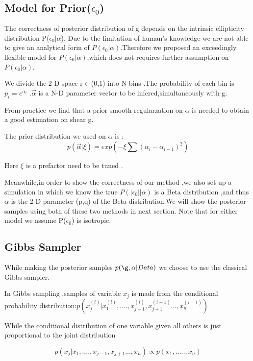 \documentclass[useAMS,usenatbib]{mn2e}
\begin{document}
\subsection{Model for Prior($\epsilon_{0}$)}

The correctness of posterior distribution of g depends on the intrinsic
ellipticity distribution P($\epsilon_{0}|\alpha$). Due to the limitation
of human's knowledge we are not able to give an analytical form of
$P(\epsilon_{0}|\alpha)$.Therefore we proposed an exceedingly flexible
model for $P(\epsilon_{0}|\alpha)$,which does not requires further
assumption on $P(\epsilon_{0}|\alpha)$.

We divide the 2-D space r$\in$(0,1) into N bins .The probability
of each bin is $p_{i}=e^{\alpha_{i}}$ .$\overrightarrow{\alpha}$
is a N-D parameter vector to be infered,simultaneously with g.

From practice we find that a prior smooth regularzation on $\alpha$
is needed to obtain a good estimation on shear g.

The prior distribution we used on $\alpha$ is : 
\begin{equation}
p(\vec{\alpha}|\xi)=exp(-\xi\sum(\alpha_{i}-\alpha_{i-1})^{2})
\end{equation}


Here $\xi$ is a prefactor need to be tuned .

Meanwhile,in order to show the correctness of our method ,we also
set up a simulation in which we know the true $P(|\epsilon_{0}||\alpha)$
is a Beta distribution ,and thus $\alpha$ is the 2-D parameter (p,q)
of the Beta distribution.We will show the posterior samples using
both of these two methods in next section. Note that for either model
we assume P($\epsilon_{0}$) is isotropic.


\subsection{Gibbs Sampler}

While making the posterior samples $p(\g,\alpha|Data)$ we choose to use the classical
Gibbs sampler.

In Gibbs sampling ,samples of variable $x_{j}$ is made from the conditional
probability distribution:$p(x_{j}^{(i)}|x_{1}^{(i)},....,x_{j-1}^{(i)},x_{j+1}^{(i-1)}...,x_{n}^{(i-1)})$

While the conditional distribution of one variable given all others
is just proportional to the joint distribution

\begin{equation}
p(x_{j}|x_{1},....,x_{j-1},x_{j+1}...,x_{n})\varpropto p(x_{1},.....,x_{n})
\end{equation}
\end{document}
